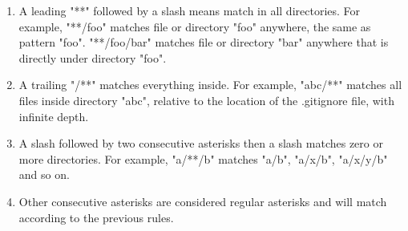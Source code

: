 \documentclass{charuun}
\begin{document}
\begin{enumerate}
\item A leading "**" followed by a slash means match in all directories. For example, "**/foo" matches file or directory "foo" anywhere, the same as pattern "foo". "**/foo/bar" matches file or directory "bar" anywhere that is directly under directory "foo".
\item A trailing "/**" matches everything inside. For example, "abc/**" matches all files inside directory "abc", relative to the location of the .gitignore file, with infinite depth.
\item A slash followed by two consecutive asterisks then a slash matches zero or more directories. For example, "a/**/b" matches "a/b", "a/x/b", "a/x/y/b" and so on.
\item Other consecutive asterisks are considered regular asterisks and will match according to the previous rules.
\end{enumerate}
\end{document}
